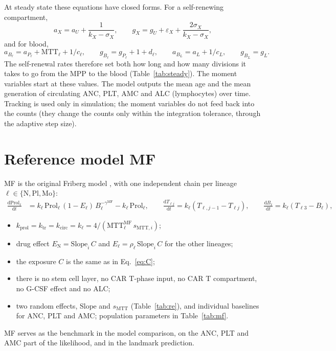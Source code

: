 \documentclass[11pt]{article}
\newcommand{\dd}{\mathrm{d}}
\begin{document}
At steady state these equations have closed forms. For a self-renewing compartment,
\begin{equation}
a_X = a_U + \frac{1}{k_X-\sigma_X},\qquad
g_X = g_U + \varepsilon_X + \frac{2\sigma_X}{k_X-\sigma_X}, \label{eq:closed}
\end{equation}
and for blood,
\begin{equation*}
a_{B_\ell} = a_{P_\ell}+\mathrm{MTT}_\ell+1/c_\ell,\qquad g_{B_\ell}=g_{P_\ell}+1+d_\ell,\qquad a_{B_L}=a_L+1/c_L,\qquad g_{B_L}=g_L.
\end{equation*}
The self-renewal rates therefore set both how long and how many divisions it takes to go from the MPP to the blood (Table~\ref{tab:steady}). The moment variables start at these values. The model outputs the mean age and the mean generation of circulating ANC, PLT, AMC and ALC (lymphocytes) over time. Tracking is used only in simulation; the moment variables do not feed back into the counts (they change the counts only within the integration tolerance, through the adaptive step size).

\section{Reference model MF}\label{sec:mf}
MF is the original Friberg model \citep{friberg2002}, with one independent chain per lineage $\ell\in\{\mathrm{N},\mathrm{Pl},\mathrm{Mo}\}$:
\begin{align}
\frac{\dd \mathrm{Prol}_\ell}{\dd t} &= k_\ell\,\mathrm{Prol}_\ell\,(1-E_\ell)\,B_\ell^{-\gamma^{\mathrm{MF}}} - k_\ell\,\mathrm{Prol}_\ell,\qquad
\frac{\dd T_{\ell j}}{\dd t} = k_\ell(T_{\ell,j-1}-T_{\ell j}),\qquad
\frac{\dd B_\ell}{\dd t} = k_\ell(T_{\ell3}-B_\ell),
\end{align}
\begin{itemize}
\item $k_{\mathrm{prol}}=k_{\mathrm{tr}}=k_{\mathrm{circ}}=k_\ell=4/(\mathrm{MTT}^{\mathrm{MF}}_\ell\,s_{\mathrm{MTT},i})$;
\item drug effect $E_{\mathrm{N}}=\mathrm{Slope}_i\,C$ and $E_\ell=\rho_\ell\,\mathrm{Slope}_i\,C$ for the other lineages;
\item the exposure $C$ is the same as in Eq.~\ref{eq:C};
\item there is no stem cell layer, no CAR T-phase input, no CAR T compartment, no G-CSF effect and no ALC;
\item two random effects, $\mathrm{Slope}$ and $s_{\mathrm{MTT}}$ (Table~\ref{tab:re}), and individual baselines for ANC, PLT and AMC; population parameters in Table~\ref{tab:mf}.
\end{itemize}
MF serves as the benchmark in the model comparison, on the ANC, PLT and AMC part of the likelihood, and in the landmark prediction.
\end{document}
